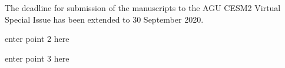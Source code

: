 \documentclass[draft]{agujournal2019}
\begin{document}





\begin{keypoints}
\item The deadline for submission of the manuscripts to the AGU CESM2 Virtual Special Issue has been extended to 30 September 2020. 
\item enter point 2 here
\item enter point 3 here
\end{keypoints}

%
%

%
%


\begin{abstract}
[ enter your Abstract here ]
\end{abstract}
\end{document}
